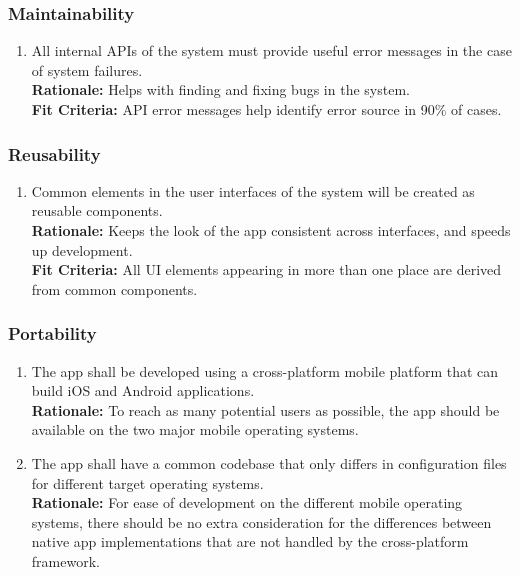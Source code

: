 \documentclass{article}
\begin{document}
\subsubsection{Maintainability}
\label{ssub:maintainability}

\begin{enumerate}[align=left, label=\textbf{DI-M\arabic*.}]
    \item All internal APIs of the system must provide useful error messages in the case of system failures. \\
          {\bf Rationale:} Helps with finding and fixing bugs in the system. \\
          {\bf Fit Criteria:} API error messages help identify error source in 90\% of cases.
\end{enumerate}

\subsubsection{Reusability}
\label{ssub:reusability}

\begin{enumerate}[align=left, label=\textbf{DI-R\arabic*.}]
    \item Common elements in the user interfaces of the system will be created as reusable components.  \\
          {\bf Rationale:} Keeps the look of the app consistent across interfaces, and speeds up development. \\
          {\bf Fit Criteria:} All UI elements appearing in more than one place are derived from common components.
\end{enumerate}

\subsubsection{Portability}
\label{ssub:portability}


\begin{enumerate}[align=left, label=\textbf{DI-P\arabic*.}]
    \item The app shall be developed using a cross-platform mobile platform that can build iOS and Android applications. \\
          {\bf Rationale:} To reach as many potential users as possible, the app should be available on the two major mobile operating systems.
    \item The app shall have a common codebase that only differs in configuration files for different target operating systems.\\
          {\bf Rationale:} For ease of development on the different mobile operating systems, there should be no extra consideration for the differences between native app implementations that are not handled by the cross-platform framework.
\end{enumerate}
\end{document}
